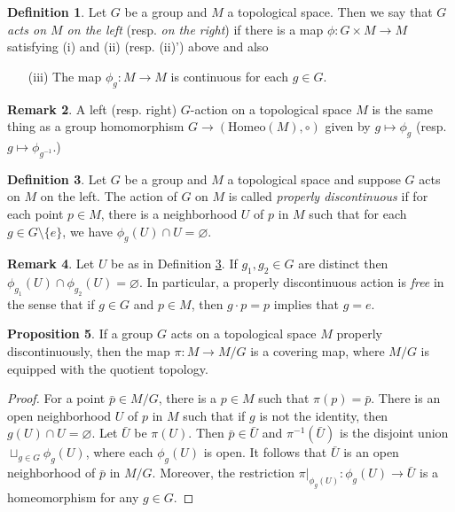\documentclass{amsart}
\numberwithin{equation}{section}
\theoremstyle{definition}
\newtheorem{definition}{Definition} [section]
\newtheorem{remark}[definition]{Remark}
\theoremstyle{theorem}
\newtheorem{proposition}[definition]{Proposition}
\begin{document}
\begin{definition}
Let $G$ be a group and $M$ a topological space. Then we say that {\em $G$ acts on $M$ on the left} (resp. {\em on the right}) if there is a map 
$\phi : G \times M \to M$ satisfying (i) and (ii) (resp. (ii)') above and also 
\begin{itemize}
\item[(iii)] The map $\phi_g : M \to M$ is continuous for each $g \in G$. 
\end{itemize}
\end{definition}

\begin{remark}
A left (resp. right) $G$-action on a topological space $M$
is the same thing as a group homomorphism $G \to (\text{Homeo}(M),\circ) $ given by
$g\mapsto \phi_g$ (resp. $g\mapsto \phi_{g^{-1}}$.) 
\end{remark}

\begin{definition}\label{proper-discon}
Let $G$ be a group and $M$ a topological space and suppose $G$ acts on $M$ on the left. The action of $G$ on $M$ is called 
{\em properly discontinuous} if for each point $p \in M$, there is a neighborhood $U$ of $p$ in $M$ such that for each $g \in G\setminus\{e\}$, we have $\phi_g(U) \cap U = \varnothing$. 
\end{definition}

\begin{remark}
Let $U$ be as in Definition \ref{proper-discon}.
If $g_1, g_2 \in G$ are distinct then $\phi_{g_1}(U) \cap \phi_{g_2}(U) = \varnothing$. 
In particular, a properly discontinuous action is {\em free} in the sense that if $g \in G$ and $p \in M$, then $g \cdot p = p$ implies that $g =e$. 
\end{remark}

\begin{proposition}
If a group $G$ acts on a topological space $M$ properly discontinuously, then the map $\pi : M \to M/G$ is a covering map,
where $M/G$ is equipped with the quotient topology. 
\end{proposition}

\begin{proof}
For a point $\bar{p} \in M/G$, there is a $p \in M$ such that $\pi(p) = \bar{p}$. There is an open neighborhood $U$ of $p$ in $M$ such that if $g$ is not the identity, then $g(U) \cap U = \varnothing$. Let $\bar{U}$ be $\pi(U)$. Then $\bar{p} \in \bar{U}$ and 
$\pi^{-1}(\bar{U})$ is the disjoint union $\sqcup_{g \in G}\phi_g(U)$, where each $\phi_g(U)$ is open. 
It follows that $\bar{U}$ is an open neighborhood of $\bar{p}$ in $M/G$. Moreover, the restriction 
$\pi|_{\phi_g(U)} : \phi_g(U) \to \bar{U}$ 
is a homeomorphism for any $g \in G$. 
\end{proof}
\end{document}
